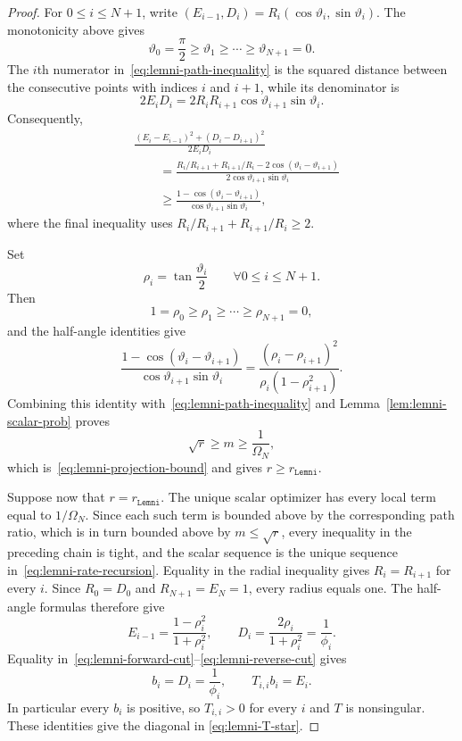 \documentclass[11pt]{article}
\begin{document}
\begin{proof}
For $0\leq i\leq N+1$, write $(E_{i-1},D_i)=R_i(\cos\vartheta_i,\sin\vartheta_i)$.
The monotonicity above gives
\[
    \vartheta_0=\frac\pi2
    \geq\vartheta_1\geq\cdots\geq
    \vartheta_{N+1}=0.
\]
The $i$th numerator in~\eqref{eq:lemni-path-inequality} is the squared
distance between the consecutive points with indices $i$ and $i+1$, while its
denominator is
\[
    2E_iD_i
    =2R_iR_{i+1}\cos\vartheta_{i+1}\sin\vartheta_i.
\]
Consequently,
\[
\begin{aligned}
&\frac{(E_i-E_{i-1})^2+(D_i-D_{i+1})^2}{2E_iD_i}\\
&\qquad=
\frac{R_i/R_{i+1}+R_{i+1}/R_i
-2\cos(\vartheta_i-\vartheta_{i+1})}
{2\cos\vartheta_{i+1}\sin\vartheta_i}\\
&\qquad\geq
\frac{1-\cos(\vartheta_i-\vartheta_{i+1})}
{\cos\vartheta_{i+1}\sin\vartheta_i},
\end{aligned}
\]
where the final inequality uses
$R_i/R_{i+1}+R_{i+1}/R_i\geq2$.

Set
\[
    \rho_i=\tan\frac{\vartheta_i}{2}
    \qquad \forall 0\leq i\leq N+1.
\]
Then
\[
    1=\rho_0\geq\rho_1\geq\cdots\geq\rho_{N+1}=0,
\]
and the half-angle identities give
\[
    \frac{1-\cos(\vartheta_i-\vartheta_{i+1})}
    {\cos\vartheta_{i+1}\sin\vartheta_i}
    =
    \frac{(\rho_i-\rho_{i+1})^2}
    {\rho_i(1-\rho_{i+1}^2)}.
\]
Combining this identity with~\eqref{eq:lemni-path-inequality} and
Lemma~\ref{lem:lemni-scalar-prob} proves
\[
\sqrt r\geq m\geq\frac1{\Omega_N},
\]
which is~\eqref{eq:lemni-projection-bound} and gives
$r\geq r_\mathtt{Lemni}$.

Suppose now that $r=r_\mathtt{Lemni}$. The unique scalar optimizer has every
local term equal to $1/\Omega_N$. Since each such term is bounded above by the
corresponding path ratio, which is in turn bounded above by $m\leq\sqrt r$,
every inequality in the preceding chain is tight, and the scalar sequence is
the unique sequence in~\eqref{eq:lemni-rate-recursion}. Equality in the radial inequality gives
$R_i=R_{i+1}$ for every $i$. Since $R_0=D_0$ and
$R_{N+1}=E_N=1$, every radius equals one. The half-angle formulas therefore
give
\begin{equation}\label{eq:lemni-equality-path}
    E_{i-1}=\frac{1-\rho_i^2}{1+\rho_i^2},
    \qquad
    D_i=\frac{2\rho_i}{1+\rho_i^2}=\frac1{\phi_i}.
\end{equation}
Equality in~\eqref{eq:lemni-forward-cut}--\eqref{eq:lemni-reverse-cut} gives
\[
    b_i=D_i=\frac1{\phi_i},
    \qquad
    T_{i,i}b_i=E_i.
\]
In particular every $b_i$ is positive, so $T_{i,i}>0$ for every
$i$ and $T$ is nonsingular. These identities give the diagonal in
\eqref{eq:lemni-T-star}.


\end{proof}
\end{document}

